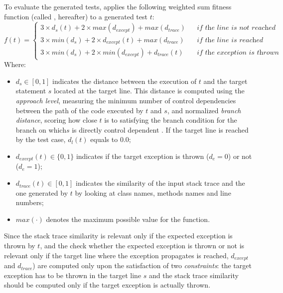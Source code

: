 To evaluate the generated tests, \evocrash applies the following weighted sum fitness function \cite{Soltani2018a} (called \CrashFunction, hereafter) to a generated test $t$:
%
\begin{equation} \label{eq:fitnessfunction}
f(t) = 
\left\{
  \begin{array}{lcr}
    3 \times d_{s}(t) + 2 \times max(d_{except}) + max(d_{trace})   && \textit{if the line is not reached}\\
    3 \times min(d_{s}) + 2 \times d_{except}(t) + max(d_{trace})   && \textit{if the line is reached}\\
    3 \times min(d_{s}) + 2 \times min(d_{except}) + d_{trace}(t)   && \textit{if the exception is thrown}
  \end{array}
\right.
\end{equation}
%
Where:
%
\begin{itemize}
\item $d_{s} \in [0,1]$ indicates the distance between the execution of $t$ and the target statement $s$ located at the target line. 
This distance is computed using the \textit{approach level}, measuring the minimum number of control dependencies between the path of the code executed by $t$ and $s$, and normalized \textit{branch distance}, scoring how close $t$ is to satisfying the branch condition for the branch on which$s$ is directly control dependent \cite{McMinn2004}. 
If the target line is reached by the test case, $d_{l}(t)$ equals to $0.0$;
%
\item $d_{except}(t) \in \{0,1\}$ indicates if the target exception is thrown ($d_{e} = 0$) or not ($d_{e} = 1$);
%
\item $d_{trace}(t) \in [0,1]$ indicates the similarity of the input stack trace and the one generated by $t$ by looking at class names, methods names and line numbers;
%
\item $max(\cdot)$ denotes the maximum possible value for the function.
\end{itemize}
%
Since the stack trace similarity is relevant only if the expected exception is thrown by $t$, and the check whether the expected exception is thrown or not is relevant only if the target line where the exception propagates is reached, $d_{except}$ and $d_{trace}$) are computed only upon the satisfaction of two \emph{constraints}: the target exception has to be thrown in the target line $s$ and the stack trace similarity should be computed only if the target exception is actually thrown. 

